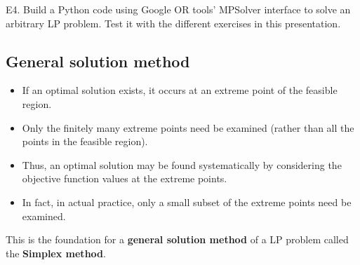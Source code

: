 \begin{program}
  E4. Build a Python code using Google OR tools' MPSolver interface to solve an arbitrary LP problem. Test it with the different exercises in this presentation.
\end{program}

\subsection{General solution method}

  \begin{itemize}
    \item If an optimal solution exists, it occurs at an extreme point of the feasible region.
    \item Only the finitely many extreme points need be examined (rather than all the points in the feasible region).
    \item Thus, an optimal solution may be found systematically by considering the objective function values at the extreme points.
    \item In fact, in actual practice, only a small subset of the extreme points need be examined.
  \end{itemize}
  This is the foundation for a {\bf general solution method} of a LP problem called the {\bf Simplex method}.

